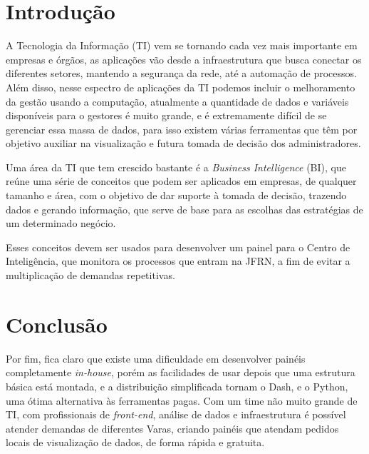 \chapter*{Introdução}

A Tecnologia da Informação (TI) vem se tornando cada vez mais importante em empresas e órgãos, as aplicações vão desde a infraestrutura que busca conectar os diferentes setores, mantendo a segurança da rede, até a automação de processos. Além disso, nesse espectro de aplicações da TI podemos incluir o melhoramento da gestão usando a computação, atualmente a quantidade de dados e variáveis disponíveis para o gestores é muito grande, e é extremamente difícil de se gerenciar essa massa de dados, para isso existem várias ferramentas que têm por objetivo auxiliar na visualização e futura tomada de decisão dos administradores.

Uma área da TI que tem crescido bastante é a \textit{Business Intelligence} (BI), que reúne uma série de conceitos que podem ser aplicados em empresas, de qualquer tamanho e área, com o objetivo de dar suporte à tomada de decisão, trazendo dados e gerando informação, que serve de base para as escolhas das estratégias de um determinado negócio.

Esses conceitos devem ser usados para desenvolver um painel para o Centro de Inteligência, que monitora os processos que entram na JFRN, a fim de evitar a multiplicação de demandas repetitivas.



%






\chapter{Conclusão}
Por fim, fica claro que existe uma dificuldade em desenvolver painéis completamente \textit{in-house}, porém as facilidades de usar depois que uma estrutura básica está montada, e a distribuição simplificada tornam o Dash, e o Python, uma ótima alternativa às ferramentas pagas. Com um time não muito grande de TI, com profissionais de \textit{front-end}, análise de dados e infraestrutura é possível atender demandas de diferentes Varas, criando painéis que atendam pedidos locais de visualização de dados, de forma rápida e gratuita.